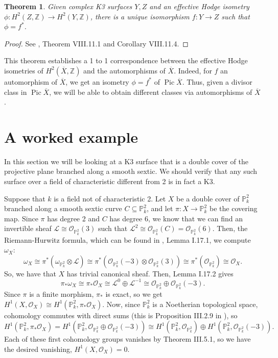 \documentclass[12pt,twoside]{reedthesis}
\theoremstyle{plain}
\newtheorem{theorem}{Theorem}[chapter]
\theoremstyle{definition}
\theoremstyle{remark}
\newcommand{\ZZ}{\mathbb{Z}}
\newcommand{\Proj}{\mathbb{P}}
\newcommand{\calO}{\mathcal{O}}
\newcommand{\calL}{\mathcal{L}}
\newcommand{\Pic}{\operatorname{Pic}}
\begin{document}
\begin{theorem}
Given complex K3 surfaces $Y,Z$ and an effective Hodge isometry $\phi:H^2(Z,\ZZ)\to H^2(Y,\ZZ)$, there is a unique isomorphism $f:Y\to Z$ such that $\phi=f^*$.
\end{theorem}
\begin{proof}
See \cite{vanDeVen}, Theorem VIII.11.1 and Corollary VIII.11.4.
\end{proof}
\noindent This theorem establishes a 1 to 1 correspondence between the effective Hodge isometries of $H^2(\overline{X},\ZZ)$ and the automorphisms of $\overline{X}$. Indeed, for $f$ an automorphism of $\overline{X}$, we get an isometry $\phi=f^*$ of $\Pic\overline{X}$. Thus, given a divisor class in $\Pic\overline{X}$, we will be able to obtain different classes via automorphisms of $\overline{X}$. 
\section{A worked example}
In this section we will be looking at a K3 surface that is a double cover of the projective plane branched along a smooth sextic. We should verify that any such surface over a field of characteristic different from 2 is in fact a K3. 

Suppose that $k$ is a field not of characteristic 2. Let $X$ be a double cover of $\Proj^2_k$ branched along a smooth sextic curve $C\subseteq\Proj^2_k$, and let $\pi:X\to\Proj^2_k$ be the covering map. Since $\pi$ has degree 2 and $C$ has degree 6, we know that we can find an invertible sheaf $\calL\cong\calO_{\Proj^2_k}(3)$ such that $\calL^2\cong\calO_{\Proj^2_k}(C)=\calO_{\Proj^2_k}(6)$. Then, the Riemann-Hurwitz formula, which can be found in \cite{vanDeVen}, Lemma I.17.1, we compute $\omega_X$:
\[
\omega_X\cong\pi^*(\omega_{\Proj^2_k}\otimes\calL)\cong\pi^*(\calO_{\Proj^2_k}(-3)\otimes\calO_{\Proj^2_k}(3))\cong\pi^*(\calO_{\Proj^2_k})\cong\calO_X.
\]
\noindent So, we have that $X$ has trivial canonical sheaf. Then, \cite{vanDeVen} Lemma I.17.2 gives
\[
\pi_*\omega_X\cong\pi_*\calO_X\cong\calL^0\oplus\calL^{-1}\cong\calO_{\Proj^2_k}\oplus\calO_{\Proj^2_k}(-3).
\]
Since $\pi$ is a finite morphism, $\pi_*$ is exact, so we get $H^1(X,\calO_X)\cong H^1(\Proj^2_k,\pi_*\calO_X)$. Now, since $\Proj^2_k$ is a Noetherian topological space, cohomology commutes with direct sums (this is Proposition III.2.9 in \cite{hartshorne}), so 
\[
H^1(\Proj^2_k,\pi_*\calO_X)=H^1(\Proj^2_k,\calO_{\Proj^2_k}\oplus\calO_{\Proj^2_k}(-3))\cong H^1(\Proj^2_k,\calO_{\Proj^2_k})\oplus H^1(\Proj^2_k,\calO_{\Proj^2_k}(-3)).
\]
Each of these first cohomology groups vanishes by \cite{hartshorne} Theorem III.5.1, so we have the desired vanishing, $H^1(X,\calO_X)=0$.
\end{document}
